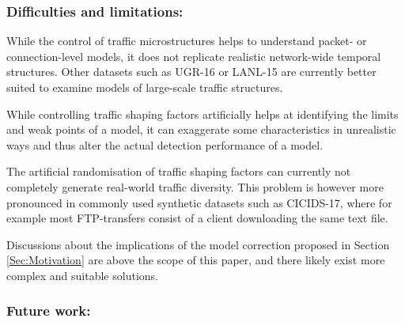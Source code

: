 \documentclass[runningheads]{llncs}
\begin{document}

\subsubsection*{Difficulties and limitations:}
While the control of traffic microstructures helps to understand packet- or connection-level models, it does not replicate realistic network-wide temporal structures. Other datasets such as UGR-16 \cite{macia2018ugr} or LANL-15 \cite{turcotte17} are currently better suited to examine models of large-scale traffic structures.

While controlling traffic shaping factors artificially helps at identifying the limits and weak points of a model, it can exaggerate some characteristics in unrealistic ways and thus alter the actual detection performance of a model. 

The artificial randomisation of traffic shaping factors can currently not completely generate real-world traffic diversity. This problem is however more pronounced in commonly used synthetic datasets such as CICIDS-17, where for example most FTP-transfers consist of a client downloading the same text file.

Discussions about the implications of the model correction proposed in Section \ref{Sec:Motivation} are above the scope of this paper, and there likely exist more complex and suitable solutions.

\subsubsection*{Future work:}
\end{document}
